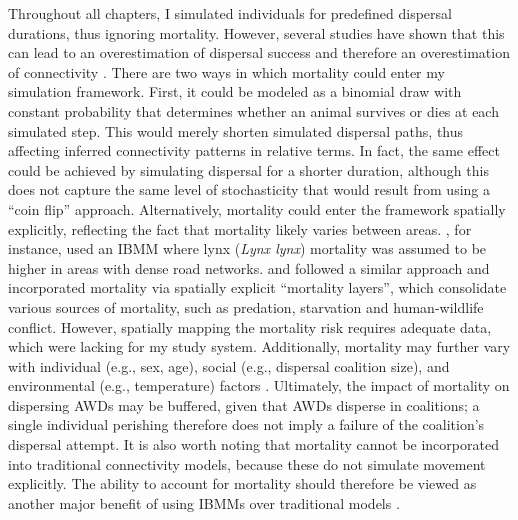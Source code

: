 \documentclass[../FinalThesis.tex]{subfiles}
\begin{document}
Throughout all chapters, I simulated individuals for predefined dispersal
durations, thus ignoring mortality. However, several studies have shown that
this can lead to an overestimation of dispersal success and therefore an
overestimation of connectivity \citep{Kramer-Schadt.2004, FletcherJr..2019,
Day.2020}. There are two ways in which mortality could enter my simulation
framework. First, it could be modeled as a binomial draw with constant
probability that determines whether an animal survives or dies at each simulated
step. This would merely shorten simulated dispersal paths, thus affecting
inferred connectivity patterns in relative terms. In fact, the same effect could
be achieved by simulating dispersal for a shorter duration, although this does
not capture the same level of stochasticity that would result from using a
``coin flip'' approach. Alternatively, mortality could enter the framework
spatially explicitly, reflecting the fact that mortality likely varies between
areas. \citet{Kramer-Schadt.2004}, for instance, used an IBMM where lynx
(\textit{Lynx lynx}) mortality was assumed to be higher in areas with dense road
networks. \citet{FletcherJr..2019} and \citet{Day.2020} followed a similar
approach and incorporated mortality via spatially explicit ``mortality layers'',
which consolidate various sources of mortality, such as predation, starvation
and human-wildlife conflict. However, spatially mapping the mortality risk
requires adequate data, which were lacking for my study system. Additionally,
mortality may further vary with individual (e.g., sex, age), social (e.g.,
dispersal coalition size), and environmental (e.g., temperature) factors
\citep{Behr.2023}. Ultimately, the impact of mortality on dispersing AWDs may be
buffered, given that AWDs disperse in coalitions; a single individual perishing
therefore does not imply a failure of the coalition's dispersal attempt. It is
also worth noting that mortality cannot be incorporated into traditional
connectivity models, because these do not simulate movement explicitly. The
ability to account for mortality should therefore be viewed as another major
benefit of using IBMMs over traditional models \citep{Diniz.2019}.
\end{document}
